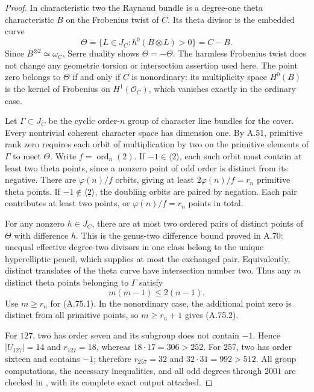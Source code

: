 \documentclass[11pt]{article}
\begin{document}
\begin{proof}
In characteristic two the Raynaud bundle is a degree-one
theta characteristic $B$ on the Frobenius twist of $C$.
Its theta divisor is the embedded curve
\[
 \Theta=\{L\in J_C:h^0(B\otimes L)>0\}=C-B.
\]
Since $B^{\otimes2}\simeq\omega_C$, Serre duality shows
$\Theta=-\Theta$. The harmless Frobenius twist does not
change any geometric torsion or intersection assertion
used here. The point zero belongs to $\Theta$ if and
only if $C$ is nonordinary: its multiplicity space
$H^0(B)$ is the kernel of Frobenius on $H^1(\mathcal O_C)$,
which vanishes exactly in the ordinary case.

Let $\Gamma\subset J_C$ be the cyclic order-$n$ group
of character line bundles for the cover. Every nontrivial
coherent character space has dimension one. By A.51,
primitive rank zero requires each orbit of multiplication
by two on the primitive elements of $\Gamma$ to meet
$\Theta$. Write $f=\operatorname{ord}_n(2)$. If
$-1\in\langle2\rangle$, each such orbit must contain
at least two theta points, since a nonzero point of odd
order is distinct from its negative. There are
$\varphi(n)/f$ orbits, giving at least
$2\varphi(n)/f=r_n$ primitive theta points. If
$-1\notin\langle2\rangle$, the doubling orbits are
paired by negation. Each pair contributes at least two
points, or $\varphi(n)/f=r_n$ points in total.

For any nonzero $h\in J_C$, there are at most two
ordered pairs of distinct points of $\Theta$ with
difference $h$. This is the genus-two difference bound
proved in A.70: unequal effective degree-two divisors
in one class belong to the unique hyperelliptic pencil,
which supplies at most the exchanged pair. Equivalently,
distinct translates of the theta curve have intersection
number two. Thus any $m$ distinct theta points belonging
to $\Gamma$ satisfy
\[
                         m(m-1)\le2(n-1).
\]
Use $m\ge r_n$ for (A.75.1). In the nonordinary case,
the additional point zero is distinct from all primitive
points, so $m\ge r_n+1$ gives (A.75.2).

For $127$, two has order seven and its subgroup does
not contain $-1$. Hence $|U_{127}|=14$ and $r_{127}=18$,
whereas $18\cdot17=306>252$. For $257$, two has
order sixteen and contains $-1$; therefore $r_{257}=32$
and $32\cdot31=992>512$. All group computations,
the necessary inequalities, and all odd degrees through
$2001$ are checked in
, with its
complete exact output attached.


\end{proof}
\end{document}
